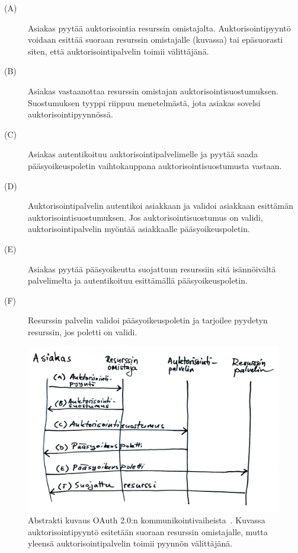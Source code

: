 \documentclass[finnish,gradu]{tktltiki}
\begin{document}
  \begin{description}
    \item[(A)]
      Asiakas pyytää auktorisointia resurssin omistajalta. Auktorisointipyyntö voidaan esittää suoraan resurssin omistajalle (kuvassa) tai epäsuorasti siten, että auktorisointipalvelin toimii välittäjänä.

    \item[(B)]
      Asiakas vastaanottaa resurssin omistajan auktorisointisuostumuksen. Suostumuksen tyyppi riippuu menetelmästä, jota asiakas sovelsi auktorisointipyynnössä.

    \item[(C)]
      Asiakas autentikoituu auktorisointipalvelimelle ja pyytää saada pääsyoikeuspoletin vaihtokauppana auktorisointisuostumusta vastaan.

    \item[(D)]
      Auktorisointipalvelin autentikoi asiakkaan ja validoi asiakkaan esittämän auktorisointisuostumuksen. Jos auktorisointisuostumus on validi, auktorisointipalvelin myöntää asiakkaalle pääsyoikeuspoletin.

    \item[(E)]
      Asiakas pyytää pääsyoikeutta suojattuun resurssiin sitä isännöivältä palvelimelta ja autentikoituu esittämällä pääsyoikeuspoletin.

    \item[(F)]
      Resurssin palvelin validoi pääsyoikeuspoletin ja tarjoilee pyydetyn resurssin, jos poletti on validi.
  \end{description}


  \begin{figure}[h!]
    \centering
    \includegraphics[width=1.0\textwidth]{images/oauth_abstract_flow.jpg}
    \caption[OAuth 2.0 -kommunikointivaiheet.]{Abstrakti kuvaus OAuth 2.0:n kommunikointivaiheista~\cite{ietf_oauth2}. Kuvassa auktorisointipyyntö esitetään suoraan resurssin omistajalle, mutta yleensä auktorisointipalvelin toimii pyynnön välittäjänä.}
    \label{fig:oauth_abstract_flow}
  \end{figure}
\end{document}
